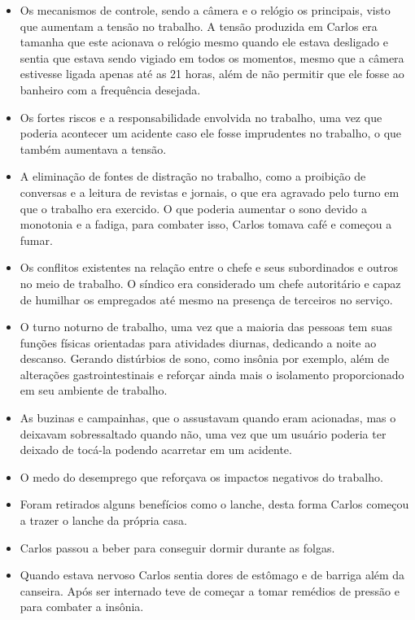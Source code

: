 \begin{description}
        \begin{itemize}
            \item Os mecanismos de controle, sendo a câmera e o relógio os principais, visto que aumentam a tensão no trabalho. A tensão produzida em Carlos era tamanha que este acionava o relógio mesmo quando ele estava desligado e sentia que estava sendo vigiado em todos os momentos, mesmo que a câmera estivesse ligada apenas até as 21 horas, além de não permitir que ele fosse ao banheiro com a frequência desejada.
            \item Os fortes riscos e a responsabilidade envolvida no trabalho, uma vez que poderia acontecer um acidente caso ele fosse imprudentes no trabalho, o que também aumentava a tensão.
            \item A eliminação de fontes de distração no trabalho, como a proibição de conversas e a leitura de revistas e jornais, o que era agravado pelo turno em que o trabalho era exercido. O que poderia aumentar o sono devido a monotonia e a fadiga, para combater isso, Carlos tomava café e começou a fumar. 
            \item Os conflitos existentes na relação entre o chefe e seus subordinados e outros no meio de trabalho. O síndico era considerado um chefe autoritário e capaz de humilhar os empregados até mesmo na presença de terceiros no serviço. 
            \item O turno noturno de trabalho, uma vez que  a maioria das pessoas tem suas funções físicas orientadas para atividades diurnas, dedicando a noite ao descanso. Gerando distúrbios de sono, como insônia por exemplo, além de alterações gastrointestinais e reforçar ainda mais o isolamento proporcionado em seu ambiente de trabalho.
            \item As buzinas e campainhas, que o assustavam quando eram acionadas, mas o deixavam sobressaltado quando não, uma vez que um usuário poderia ter deixado de tocá-la podendo acarretar em um acidente.
            \item O medo do desemprego que reforçava os impactos negativos do trabalho.
            \item Foram retirados alguns benefícios como o lanche, desta forma Carlos começou a trazer o lanche da própria casa. 
            \item Carlos passou a beber para conseguir dormir durante as folgas. 
            \item Quando estava nervoso Carlos sentia dores de estômago e de barriga além da canseira. Após ser internado teve de começar a tomar remédios de pressão e para combater a insônia. 
        \end{itemize}
        

\end{description}
